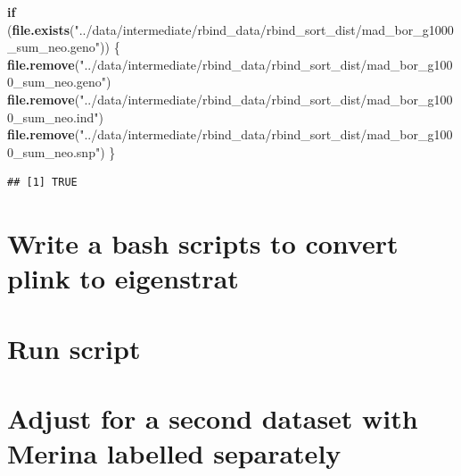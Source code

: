 \documentclass[
]{article}
\newenvironment{Shaded}{\begin{snugshade}}{\end{snugshade}}
\newcommand{\ControlFlowTok}[1]{\textcolor[rgb]{0.13,0.29,0.53}{\textbf{#1}}}
\newcommand{\FunctionTok}[1]{\textcolor[rgb]{0.13,0.29,0.53}{\textbf{#1}}}
\newcommand{\NormalTok}[1]{#1}
\newcommand{\StringTok}[1]{\textcolor[rgb]{0.31,0.60,0.02}{#1}}
\begin{document}
\begin{Shaded}
\begin{Highlighting}[]
\ControlFlowTok{if}\NormalTok{ (}\FunctionTok{file.exists}\NormalTok{(}\StringTok{"../data/intermediate/rbind\_data/rbind\_sort\_dist/mad\_bor\_g1000\_sum\_neo.geno"}\NormalTok{)) \{}
  \FunctionTok{file.remove}\NormalTok{(}\StringTok{"../data/intermediate/rbind\_data/rbind\_sort\_dist/mad\_bor\_g1000\_sum\_neo.geno"}\NormalTok{)}
  \FunctionTok{file.remove}\NormalTok{(}\StringTok{"../data/intermediate/rbind\_data/rbind\_sort\_dist/mad\_bor\_g1000\_sum\_neo.ind"}\NormalTok{)}
  \FunctionTok{file.remove}\NormalTok{(}\StringTok{"../data/intermediate/rbind\_data/rbind\_sort\_dist/mad\_bor\_g1000\_sum\_neo.snp"}\NormalTok{)}
\NormalTok{\}}
\end{Highlighting}
\end{Shaded}

\begin{verbatim}
## [1] TRUE
\end{verbatim}

\section{Write a bash scripts to convert plink to
eigenstrat}\label{write-a-bash-scripts-to-convert-plink-to-eigenstrat}

\section{Run script}\label{run-script}

\section{Adjust for a second dataset with Merina labelled
separately}\label{adjust-for-a-second-dataset-with-merina-labelled-separately}
\end{document}

